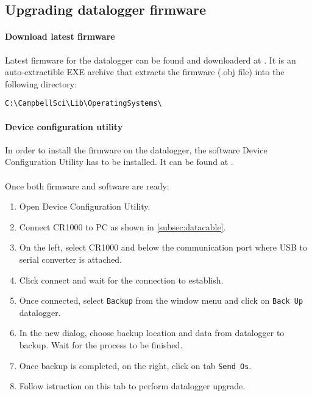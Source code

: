 \subsection{Upgrading datalogger firmware}
\paragraph{Download latest firmware} Latest firmware for the datalogger can be found and downloaderd at \cite{cs4}. It is an auto-extractible EXE archive that extracts the firmware (.obj file) into the following directory:
\begin{center}
	{\tt C:\textbackslash CampbellSci\textbackslash Lib\textbackslash OperatingSystems\textbackslash }
\end{center}
\paragraph{Device configuration utility} In order to install the firmware on the datalogger, the software Device Configuration Utility has to be installed. It can be found at \cite{cs3}.
\paragraph{} Once both firmware and software are ready:
\begin{enumerate}
	\item Open Device Configuration Utility.
	\item Connect CR1000 to PC as shown in \ref{subsec:datacable}.
	\item On the left, select CR1000 and below the communication port where USB to serial converter is attached.
	\item Click connect and wait for the connection to establish.
	\item Once connected, select {\tt Backup} from the window menu and click on {\tt Back Up} datalogger.
	\item In the new dialog, choose backup location and data from datalogger to backup. Wait for the process to be finished.
	\item Once backup is completed, on the right, click on tab {\tt Send Os}.
	\item Follow istruction on this tab to perform datalogger upgrade.
\end{enumerate}